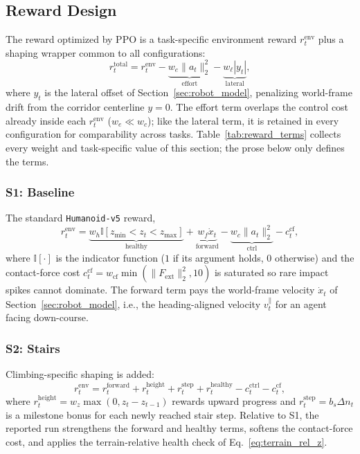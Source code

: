 \documentclass[conference,a4paper]{IEEEtran}
\begin{document}
\subsection{Reward Design}
\label{sec:reward_design}

The reward optimized by PPO is a task-specific environment reward $r_t^{\mathrm{env}}$ plus a shaping wrapper common to all configurations:
\begin{equation}
\label{eq:total_reward}
r_t^{\mathrm{total}} = r_t^{\mathrm{env}} - \underbrace{w_e \|a_t\|_2^2}_{\text{effort}} - \underbrace{w_\ell |y_t|}_{\text{lateral}},
\end{equation}
where $y_t$ is the lateral offset of Section~\ref{sec:robot_model}, penalizing world-frame drift from the corridor centerline $y{=}0$. The effort term overlaps the control cost already inside each $r_t^{\mathrm{env}}$ ($w_e \ll w_c$); like the lateral term, it is retained in every configuration for comparability across tasks. Table~\ref{tab:reward_terms} collects every weight and task-specific value of this section; the prose below only defines the terms.

\subsubsection{S1: Baseline} The standard \texttt{Humanoid-v5} reward,
\begin{equation}
\label{eq:s1_reward}
r_t^{\mathrm{env}} = \underbrace{w_h \mathbb{I}\!\left[z_{\min} {<} z_t {<} z_{\max}\right]}_{\text{healthy}} + \underbrace{w_f \dot{x}_t}_{\text{forward}} - \underbrace{w_c \lVert a_t \rVert_2^2}_{\text{ctrl}} - c_t^{\mathrm{cf}},
\end{equation}
where $\mathbb{I}[\cdot]$ is the indicator function ($1$ if its argument holds, $0$ otherwise) and the contact-force cost $c_t^{\mathrm{cf}} = w_{\mathrm{cf}}\min(\lVert F_{\mathrm{ext}} \rVert_2^2, 10)$ is saturated so rare impact spikes cannot dominate. The forward term pays the world-frame velocity $\dot{x}_t$ of Section~\ref{sec:robot_model}, i.e., the heading-aligned velocity $v_t^{\parallel}$ for an agent facing down-course.

\subsubsection{S2: Stairs} Climbing-specific shaping is added:
\begin{equation}
\label{eq:s2_reward}
r_t^{\mathrm{env}} = r_t^{\mathrm{forward}} + r_t^{\mathrm{height}} + r_t^{\mathrm{step}} + r_t^{\mathrm{healthy}} - c_t^{\mathrm{ctrl}} - c_t^{\mathrm{cf}},
\end{equation}
where $r_t^{\mathrm{height}} = w_z \max(0, z_t - z_{t-1})$ rewards upward progress and $r_t^{\mathrm{step}} = b_s \Delta n_t$ is a milestone bonus for each newly reached stair step. Relative to S1, the reported run strengthens the forward and healthy terms, softens the contact-force cost, and applies the terrain-relative health check of Eq.~\eqref{eq:terrain_rel_z}.
\end{document}
